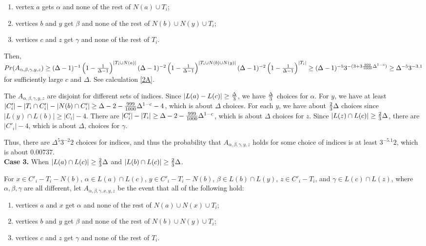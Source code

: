 \documentclass[12pt]{article}
\theoremstyle{definition}
\begin{document}
\begin{enumerate}[$(i)$]
\item vertex $a$ gets $\alpha$ and none of the rest of $N(a)\cup T_i$;
\item vertices $b$ and $y$ get $\beta$ and none of the rest of $N(b)\cup N(y) \cup T_i$;
\item vertices $c$ and $z$ get $\gamma$ and none of the rest of $T_i$.
\end{enumerate} 

Then, $Pr(A_{\alpha, \beta, \gamma, y, z})\geq (\Delta-1)^{-1}\left(1-{1\over \Delta-1}\right)^{|T_i\cup N(a)|}(\Delta-1)^{-2}\left(1-{1\over \Delta-1}\right)^{|T_i\cup N(b)\cup N(y)|}(\Delta-1)^{-2}\left(1-{1\over \Delta-1}\right)^{|T_i|}\geq (\Delta-1)^{-5}3^{-(3+3{999\over 1 000}\Delta^{1-c})}\geq \Delta^{-5} 3^{-3.1}$ for sufficiently large $c$ and $\Delta$. See calculation \ref{2A}.

The $A_{\alpha, \beta, \gamma, y, z}$ are disjoint for different sets of indices. 
Since $|L(a)-L(c)|\geq {\Delta\over 3}$, we have $\Delta\over 3$ choices for $\alpha$. 
For $y$, we have at least $|C'_i|-|T_i\cap C'_i|-|N(b)\cap C'_i|\geq \Delta-2-{999\over 1000}\Delta^{1-c}-4$, which is about $\Delta$ choices. 
For each $y$, we have about ${2\over 3}\Delta$ choices since $|L(y)\cap L(b)|\geq |C_i|-4$. 
There are $|C'_i|-|T_i|\geq \Delta-2-{999\over 1000}\Delta^{1-c}$, which is about $\Delta$ choices for $z$. Since $|L(z)\cap L(c)|\geq {2\over 3}\Delta$, there are $|C'_i|-4$, which is about $\Delta$, choices for $\gamma$. 

Thus, there are $\Delta^5 3^{-2}2$ choices for indices, and thus the probability that $A_{\alpha, \beta, \gamma, y, z}$ holds for some choice of indices is at least $3^{-5.1}2$, which is about $0.00737$. \\

{\bf Case 3.} When $|L(a)\cap L(c)|\geq {2\over 3}\Delta$ and $|L(b)\cap L(c)|\geq{2\over 3}\Delta$.

For $x\in C'_i-T_i-N(b)$, $\alpha\in L(a)\cap L(c)$, $y\in C'_i-T_i-N(b)$, $\beta\in L(b)\cap L(y)$, $z\in C'_i-T_i$, and $\gamma\in L(c)\cap L(z)$, where $\alpha, \beta, \gamma$ are all different, let $A_{\alpha, \beta, \gamma, x, y, z}$ be the event that all of the following hold:

\begin{enumerate}[$(i)$]
\item vertices $a$ and $x$ get $\alpha$ and none of the rest of $N(a)\cup N(x)\cup T_i$;
\item vertices $b$ and $y$ get $\beta$ and none of the rest of $N(b)\cup N(y) \cup T_i$;
\item vertices $c$ and $z$ get $\gamma$ and none of the rest of $T_i$.
\end{enumerate} 
\end{document}
